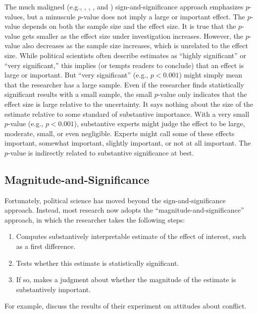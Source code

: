 \documentclass[12pt]{article}
\begin{document}
The much maligned (e.g., \citealt{Cohen1990}, \citealt{Gill1999}, \citealt{HillJones2014}, and \citealt{Gross2014}) sign-and-significance approach emphasizes $p$-values, but a minuscule $p$-value does not imply a large or important effect. The $p$-value depends on both the sample size and the effect size. It is true that the $p$-value gets smaller as the effect size under investigation increases. However, the $p$-value also decreases as the sample size increases, which is unrelated to the effect size. While political scientists often describe estimates as ``highly significant'' or ``very significant,'' this implies (or tempts readers to conclude) that an effect is large or important. But ``very significant'' (e.g., $p < 0.001$) might simply mean that the researcher has a large sample. Even if the researcher finds statistically significant results with a small sample, the small $p$-value only indicates that the effect size is large relative to the uncertainty. It says nothing about the size of the estimate relative to some standard of substantive importance. With a very small $p$-value (e.g., $p < 0.001$), substantive experts might judge the effect to be large, moderate, small, or even negligible. Experts might call some of these effects important, somewhat important, slightly important, or not at all important. The $p$-value is indirectly related to substantive significance at best.

\subsection*{Magnitude-and-Significance}

Fortunately, political science has moved beyond the sign-and-significance approach. Instead, most research now adopts the ``magnitude-and-significance'' approach, in which the researcher takes the following steps: 

\begin{enumerate}
\item Computes substantively interpretable estimate of the effect of interest, such as a first difference.
\item Tests whether this estimate is statistically significant.
\item If so, makes a judgment about whether the magnitude of the estimate is substantively important.
\end{enumerate}

For example, \cite{TomzWeeks2013} discuss the results of their experiment on attitudes about conflict.
\end{document}
